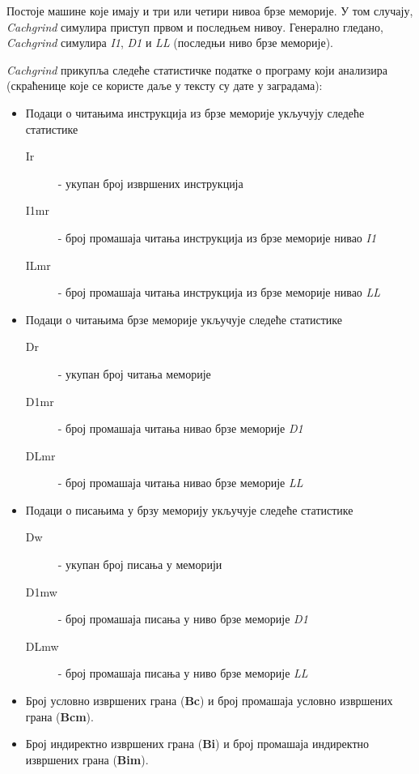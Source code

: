 \documentclass[12pt,oneside]{memoir}
\begin{document}
\indent Постоје машине које имају и три или четири нивоа брзе меморије. У том случају, \textit{Cachgrind} симулира приступ првом и последњем нивоу. Генерално гледано, \textit{Cachgrind} симулира  \textit{I1}, \textit{D1} и \textit{LL} (последњи ниво брзе меморије).

\indent \textit{Cachgrind} прикупља следеће статистичке податке о програму који анализира (скраћенице које се користе даље у тексту су дате у заградама):

\begin{itemize}
	\item  Подаци о читањима инструкција из брзе меморије укључују следеће статистике
\begin{description}
	\item[Ir] - укупан број извршених инструкција
	\item[I1mr] - број промашаја читања инструкција из брзе меморије нивао \textit{I1}
	\item[ILmr] - број промашаја читања инструкција из брзе меморије нивао \textit{LL}
\end{description}
	\item Подаци о читањима брзе меморије укључује следеће статистике
\begin{description}
	\item[Dr] - укупан број читања меморије
	\item[D1mr] - број промашаја читања нивао брзе меморије \textit{D1}
	\item[DLmr] - број промашаја читања нивао брзе меморије \textit{LL}
\end{description}
	\item Подаци о писањима у брзу меморију укључује следеће статистике
\begin{description}
	\item[Dw] - укупан број писања у меморији
	\item[D1mw] - број промашаја писања у ниво брзе меморије \textit{D1}
	\item[DLmw] - број промашаја писања у ниво брзе меморије \textit{LL}
\end{description}
	\item Број условно извршених грана (\textbf{Bc}) и број промашаја условно извршених грана (\textbf{Bcm}).
	\item Број индиректно извршених грана (\textbf{Bi}) и број промашаја индиректно извршених грана (\textbf{Bim}).
\end{itemize}
    
   
\end{document}
